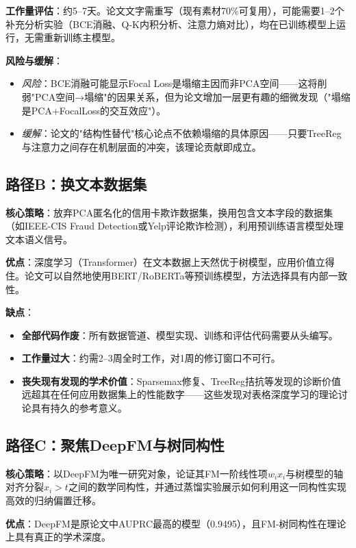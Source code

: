 \documentclass[UTF8,a4paper,12pt,fontset=fandol]{ctexart}
\begin{document}
\textbf{工作量评估}：约5--7天。论文文字需重写（现有素材70\%可复用），可能需要1--2个补充分析实验（BCE消融、Q-K内积分析、注意力熵对比），均在已训练模型上运行，无需重新训练主模型。

\textbf{风险与缓解}：
\begin{itemize}
    \item \textit{风险}：BCE消融可能显示Focal Loss是塌缩主因而非PCA空间——这将削弱"PCA空间→塌缩"的因果关系，但为论文增加一层更有趣的细微发现（"塌缩是PCA+FocalLoss的交互效应"）。
    \item \textit{缓解}：论文的"结构性替代"核心论点不依赖塌缩的具体原因——只要TreeReg与注意力之间存在机制层面的冲突，该理论贡献即成立。
\end{itemize}

\subsection{路径B：换文本数据集}

\textbf{核心策略}：放弃PCA匿名化的信用卡欺诈数据集，换用包含文本字段的数据集（如IEEE-CIS Fraud Detection或Yelp评论欺诈检测），利用预训练语言模型处理文本语义信号。

\textbf{优点}：深度学习（Transformer）在文本数据上天然优于树模型，应用价值立得住。论文可以自然地使用BERT/RoBERTa等预训练模型，方法选择具有内部一致性。

\textbf{缺点}：
\begin{itemize}
    \item \textbf{全部代码作废}：所有数据管道、模型实现、训练和评估代码需要从头编写。
    \item \textbf{工作量过大}：约需2--3周全时工作，对1周的修订窗口不可行。
    \item \textbf{丧失现有发现的学术价值}：Sparsemax修复、TreeReg拮抗等发现的诊断价值远超其在任何应用数据集上的性能数字——这些发现对表格深度学习的理论讨论具有持久的参考意义。
\end{itemize}

\subsection{路径C：聚焦DeepFM与树同构性}

\textbf{核心策略}：以DeepFM为唯一研究对象，论证其FM一阶线性项$w_i x_i$与树模型的轴对齐分裂$x_i > t$之间的数学同构性，并通过蒸馏实验展示如何利用这一同构性实现高效的归纳偏置迁移。

\textbf{优点}：DeepFM是原论文中AUPRC最高的模型（0.9495），且FM-树同构性在理论上具有真正的学术深度。
\end{document}
